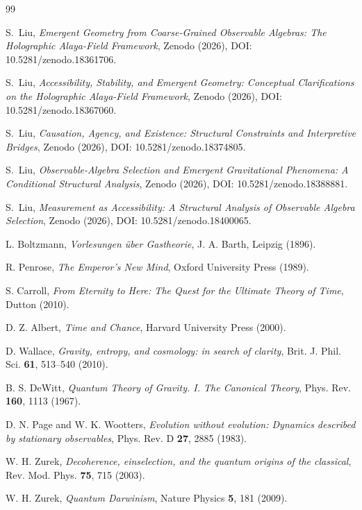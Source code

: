 \documentclass[12pt,a4paper]{article}
\begin{document}
\begin{thebibliography}{99}

S.~Liu, \emph{Emergent Geometry from Coarse-Grained Observable Algebras: The Holographic Alaya-Field Framework}, Zenodo (2026), DOI: 10.5281/zenodo.18361706.

S.~Liu, \emph{Accessibility, Stability, and Emergent Geometry: Conceptual Clarifications on the Holographic Alaya-Field Framework}, Zenodo (2026), DOI: 10.5281/zenodo.18367060.

S.~Liu, \emph{Causation, Agency, and Existence: Structural Constraints and Interpretive Bridges}, Zenodo (2026), DOI: 10.5281/zenodo.18374805.

S.~Liu, \emph{Observable-Algebra Selection and Emergent Gravitational Phenomena: A Conditional Structural Analysis}, Zenodo (2026), DOI: 10.5281/zenodo.18388881.

S.~Liu, \emph{Measurement as Accessibility: A Structural Analysis of Observable Algebra Selection}, Zenodo (2026), DOI: 10.5281/zenodo.18400065.

L. Boltzmann, \emph{Vorlesungen \"uber Gastheorie}, J. A. Barth, Leipzig (1896).

R. Penrose, \emph{The Emperor's New Mind}, Oxford University Press (1989).

S. Carroll, \emph{From Eternity to Here: The Quest for the Ultimate Theory of Time}, Dutton (2010).

D. Z. Albert, \emph{Time and Chance}, Harvard University Press (2000).

D. Wallace, \emph{Gravity, entropy, and cosmology: in search of clarity}, Brit. J. Phil. Sci. \textbf{61}, 513--540 (2010).

B. S. DeWitt, \emph{Quantum Theory of Gravity. I. The Canonical Theory}, Phys. Rev. \textbf{160}, 1113 (1967).

D. N. Page and W. K. Wootters, \emph{Evolution without evolution: Dynamics described by stationary observables}, Phys. Rev. D \textbf{27}, 2885 (1983).

W. H. Zurek, \emph{Decoherence, einselection, and the quantum origins of the classical}, Rev. Mod. Phys. \textbf{75}, 715 (2003).

W. H. Zurek, \emph{Quantum Darwinism}, Nature Physics \textbf{5}, 181 (2009).


\end{thebibliography}
\end{document}
